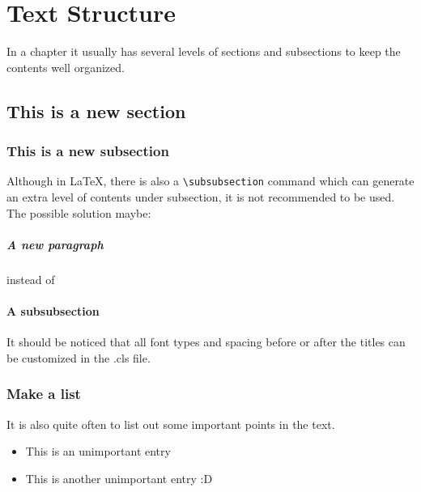 \chapter{Text Structure}

\graphicspath{ {graphics/Chapter3/} }

In a chapter it usually has several levels of sections and subsections to keep the contents well organized. 

\section{This is a new section}

	\subsection{This is a new subsection}
	
		Although in \LaTeX, there is also a {\verb!\subsubsection!} command which can generate an extra level of contents under subsection, it is not recommended to be used. The possible solution maybe:
		
		\paragraph{A new paragraph}
		
		instead of 
		
		\subsubsection{A subsubsection}
		
		It should be noticed that all font types and spacing before or after the titles can be customized in the .cls file.
		
	\subsection{Make a list}
		
		It is also quite often to list out some important points in the text.
		
		\begin{itemize}
			\item This is an unimportant entry
			\item This is another unimportant entry :D
		\end{itemize}